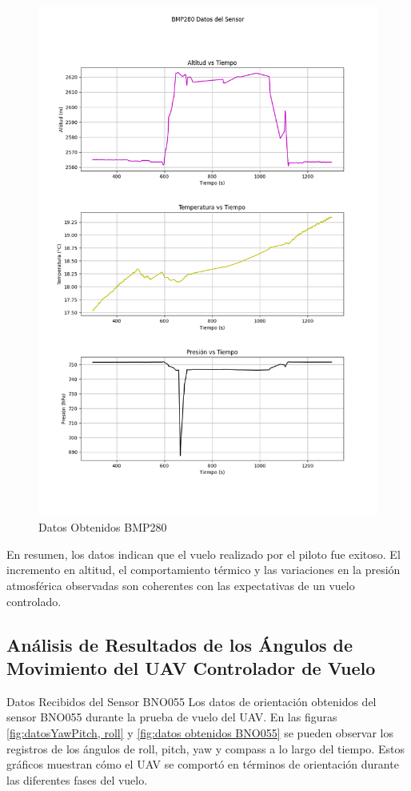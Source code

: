         \begin{figure}[H]
            \centering
            \includegraphics[width=\textwidth]{Imagenes/Vuelo/BMP280_sensor.png}
            \caption{Datos Obtenidos BMP280}
            \label{fig:datos obtenidos bmp280}
        \end{figure}



        En resumen, los datos indican que el vuelo realizado por el piloto fue exitoso. El incremento en altitud, el comportamiento térmico y las variaciones en la presión atmosférica observadas son coherentes con las expectativas de un vuelo controlado. 


    \subsection{Análisis de Resultados de los Ángulos de Movimiento del UAV Controlador de Vuelo}
        Datos Recibidos del Sensor BNO055
        Los datos de orientación obtenidos del sensor BNO055 durante la prueba de vuelo del UAV.  En las figuras  \ref{fig:datosYawPitch, roll} y \ref{fig:datos obtenidos BNO055} se pueden observar los registros de los ángulos de roll, pitch, yaw y compass a lo largo del tiempo. Estos gráficos muestran cómo el UAV se comportó en términos de orientación durante las diferentes fases del vuelo. \\ 

